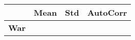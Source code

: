 \begin{tiny}\begin{tabular}{|l|c|c|c|}
\hline
&\textbf{Mean}&\textbf{Std}&\textbf{AutoCorr}\\\hline
\textbf{War}&&&\\\hline
\end{tabular}
\end{tiny}